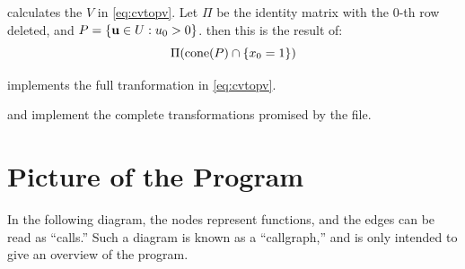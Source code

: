  calculates the $V$ in \eqref{eq:cvtopv}.  Let $\Pi$ be the identity matrix with the $0$-th row deleted, and $P = \left\{\mathbf{u} \in U : u_0 > 0\right\}$. then this is the result of:
\[ \Pi(\operatorname{cone}(P) \cap \left\{x_0 = 1\right\}) \]
\lstnormalizedP

 implements the full tranformation in \eqref{eq:cvtopv}.
\lstvconetovpoly

 and  implement the complete transformations promised by the file.
\lsthpolytovpoly
\lstvpolytohpoly

\section{Picture of the Program}
In the following diagram, the nodes represent functions, and the edges can be read as ``calls.''  Such a diagram is known as a ``callgraph,'' and is only intended to give an overview of the program.\\
